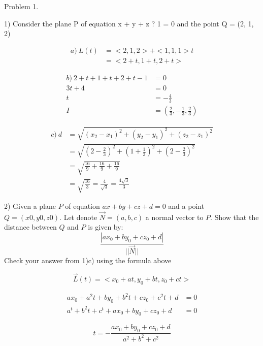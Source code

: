 \documentclass{article}
\begin{document}
\begin{text}
Problem 1. \\
\end{text}

\begin{text}
1) Consider the plane P of equation x + y + z ? 1 = 0 and the point Q = (2, 1, 2)
\end{text}

\begin{align*}
a) \: L(t) &= < 2, 1, 2 > + < 1, 1, 1 >t \\
&= < 2 + t, 1 + t, 2 + t >
\end{align*}

\begin{align*}
b) \: 2 + t + 1 + t + 2 + t -1 &= 0 \\
3t + 4 &= 0 \\
t &= -\frac{4}{3} \\
I &= (\frac{2}{3}, -\frac{1}{3}, \frac{2}{3})
\end{align*}

\begin{align*}
c) \: d &= \sqrt{(x_2 - x_1)^2 + (y_2 - y_1)^2 + (z_2 - z_1)^2} \\
&= \sqrt{(2 - \frac{2}{3})^2 + (1 + \frac{1}{3})^2 + (2 - \frac{2}{3})^2} \\
&= \sqrt{\frac{16}{9} + \frac{16}{9} + \frac{16}{9}} \\
&= \sqrt{\frac{16}{3}} = \frac{4}{\sqrt{3}} = \frac{4\sqrt{3}}{3}
\end{align*}

\begin{text}
2) Given a plane $P$ of equation $ax + by + cz + d = 0$ and a point $Q = (x0, y0, z0)$. Let denote $\vec{N} = (a, b, c)$ a normal vector to $P$.
Show that the distance between $Q$ and $P$ is given by:
$$
\frac{|ax_0 + by_0 + cz_0 + d|}{||\vec{N}||}
$$
\centering
Check your answer from 1)c) using the formula above\par
\end{text}


$$
\vec{L}(t) = <x_0 + at, y_0 + bt, z_0 + ct>
$$

\begin{align*}
ax_0 + a^2t + by_0 + b^2t + cz_0 + c^2t + d &= 0 \\
a^t + b^2t + c^t + ax_0 + by_0 + cz_0 +d &= 0
\end{align*}

$$
t = -\frac{ax_0 + by_0 + cz_0 + d}{a^2 + b^2 + c^2}
$$
\end{document}
